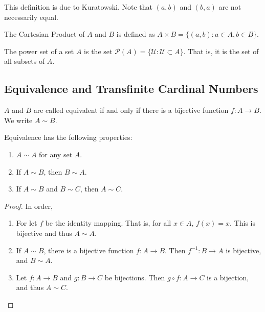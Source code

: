             \begin{remark}
            This definition is due to Kuratowski. Note that $(a,b)$ and $(b,a)$ are not necessarily equal.
            \end{remark}
            \begin{definition}
            The Cartesian Product of $A$ and $B$ is defined as $A\times B = \{(a,b):a\in A, b\in B\}$.
            \end{definition}
            \begin{definition}
            The power set of a set $A$ is the set $\mathcal{P}(A) = \{\mathcal{U}:\mathcal{U}\subset A\}$. That is, it is the set of all subsets of $A$.
            \end{definition}
        \subsection{Equivalence and Transfinite Cardinal Numbers}
            \begin{definition}
            $A$ and $B$ are called equivalent if and only if there is a bijective function $f:A\rightarrow B$. We write $A\sim B$.
            \end{definition}
            \begin{theorem}
            Equivalence has the following properties:
            \begin{enumerate}
            \item $A\sim A$ for any set $A$.
            \item If $A\sim B$, then $B\sim A$.
            \item If $A\sim B$ and $B\sim C$, then $A\sim C$.
            \end{enumerate}
            \end{theorem}
            \begin{proof}
            In order,
            \begin{enumerate}
            \item For let $f$ be the identity mapping. That is, for all $x\in A$, $f(x) = x$. This is bijective and thus $A\sim A$.
            \item If $A\sim B$, there is a bijective function $f:A\rightarrow B$. Then $f^{-1}:B\rightarrow A$ is bijective, and $B\sim A$.
            \item Let $f:A\rightarrow B$ and $g:B\rightarrow C$ be bijections. Then $g\circ f:A\rightarrow C$ is a bijection, and thus $A\sim C$.
            \end{enumerate}
            \end{proof}
